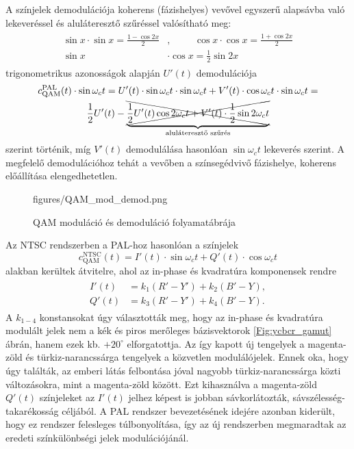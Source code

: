 A színjelek demodulációja koherens (fázishelyes) vevővel egyszerű alapsávba való lekeveréssel és aluláteresztő szűréssel valósítható meg:
\begin{align}
\begin{split}
\sin x \cdot \sin x = \frac{1-\cos 2x}{2}&,\hspace{1cm}
\cos x \cdot \cos x = \frac{1+\cos 2x}{2} \\
\sin x &\cdot \cos x = \frac{1}{2}\sin 2x
\end{split}
\end{align}
trigonometrikus azonosságok alapján $U'(t)$ demodulációja
\begin{multline}
c^{\mathrm{PAL}}_{\mathrm{QAM}}(t)\cdot \sin \omega_c t = U'(t)\cdot \sin \omega_c t\cdot \sin \omega_c t + V'(t) \cdot \cos \omega_c t  \cdot	\sin \omega_c t = \\
\frac{1}{2} U'(t) -
\underbrace{ \xcancel{ \frac{1}{2} U'(t)\cos 2 \omega_c t  + V'(t) \cdot \frac{1}{2}\sin 2 \omega_c t }}_{\text{aluláteresztő szűrés}}
\end{multline}
szerint történik, míg $V'(t)$ demodulálása hasonlóan $\sin \omega_c t$ lekeverés szerint.
A megfelelő demodulációhoz tehát a vevőben a színsegédvivő fázishelye, koherens előállítása elengedhetetlen.
\begin{figure}[]
	\centering
	\hspace{4mm}
	\begin{overpic}[width = 0.90\columnwidth ]{figures/QAM_mod_demod.png}
	\end{overpic}
	\caption{QAM moduláció és demoduláció folyamatábrája}
	\label{Fig:QAM_mod_demod}
\end{figure}

Az NTSC rendszerben a PAL-hoz hasonlóan a színjelek
\begin{equation}
c^{\mathrm{NTSC}}_{\mathrm{QAM}}(t) = I'(t) \cdot \sin \omega_c t + Q'(t) \cdot \cos \omega_c t
\end{equation}
alakban kerültek átvitelre, ahol az in-phase és kvadratúra komponensek rendre
\begin{align}
\begin{split}
I'(t) &= k_1 (R'-Y') + k_2 (B'-Y) ,\\ 
Q'(t) &= k_3 (R'-Y') + k_4 (B'-Y).
\end{split}
\end{align}
A $k_{1-4}$ konstansokat úgy választották meg, hogy az in-phase és kvadratúra modulált jelek nem a kék és piros merőleges bázisvektorok \ref{Fig:ycbcr_gamut} ábrán, hanem ezek kb. $+20^{\circ}$ elforgatottja.
Az így kapott új tengelyek a magenta-zöld és türkiz-narancssárga tengelyek a közvetlen modulálójelek.
Ennek oka, hogy úgy találták, az emberi látás felbontása jóval nagyobb türkiz-narancssárga közti változásokra, mint a magenta-zöld között.
Ezt kihasználva a magenta-zöld $Q'(t)$ színjeleket az $I'(t)$ jelhez képest is jobban sávkorlátozták, sávszélesség-takarékosság céljából.
A PAL rendszer bevezetésének idejére azonban kiderült, hogy ez rendszer felesleges túlbonyolítása, így az új rendszerben megmaradtak az eredeti színkülönbségi jelek modulációjánál.

